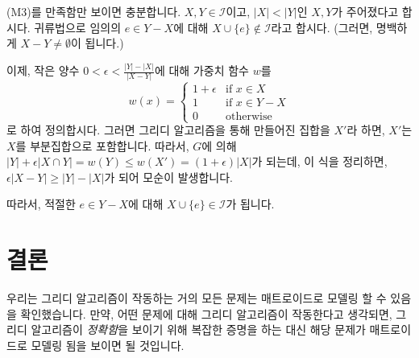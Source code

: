 \documentclass[11pt, a4paper]{book}
\newcommand{\I}{\mathcal{I}}
\begin{document}
    \begin{MLPrf}
        (M3)를 만족함만 보이면 충분합니다. $X, Y \in \I$이고, $|X| < |Y|$인 $X, Y$가 주어졌다고 합시다. 귀류법으로 임의의 $e \in Y-X$에 대해 $X \cup \{e\} \not \in \I$라고 합시다. (그러면, 명백하게 $X-Y \neq \emptyset$이 됩니다.)
        
        이제, 작은 양수 $0 < \epsilon < \frac{|Y|-|X|}{|X-Y|}$에 대해 가중치 함수 $w$를
        $$ w(x) = \begin{cases}
            1 + \epsilon & \text{if } x \in X \\
            1 & \text{if } x \in Y - X \\
            0 & \text{otherwise}
            \end{cases} $$
        로 하여 정의합시다. 그러면 그리디 알고리즘을 통해 만들어진 집합을 $X'$라 하면, $X'$는 $X$를 부분집합으로 포함합니다. 따라서, $G$에 의해 $|Y| + \epsilon |X \cap Y| = w(Y) \le w(X') = (1+\epsilon) |X|$가 되는데, 이 식을 정리하면, $\epsilon |X - Y| \ge |Y|-|X|$가 되어 모순이 발생합니다.
        
        따라서, 적절한 $e \in Y - X$에 대해 $X \cup \{e\} \in \I$가 됩니다.
    \end{MLPrf}
    
    \section{결론}
    
    우리는 그리디 알고리즘이 작동하는 거의 모든 문제는 매트로이드로 모델링 할 수 있음을 확인했습니다. 만약, 어떤 문제에 대해 그리디 알고리즘이 작동한다고 생각되면, 그리디 알고리즘이 \emph{정확함}을 보이기 위해 복잡한 증명을 하는 대신 해당 문제가 매트로이드로 모델링 됨을 보이면 될 것입니다.
\end{document}
